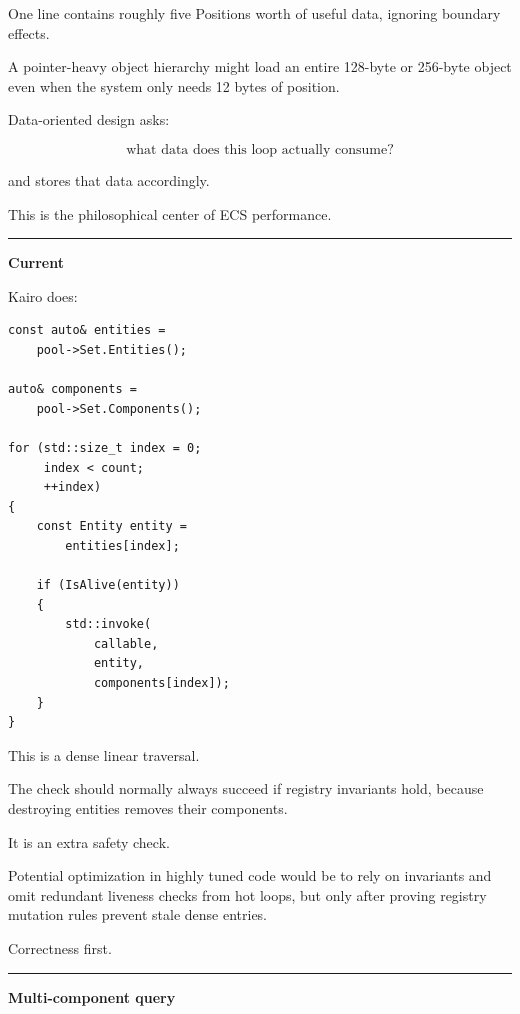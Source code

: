 One line contains roughly five Positions worth of useful data, ignoring boundary effects.

A pointer-heavy object hierarchy might load an entire 128-byte or 256-byte object even when the system only needs 12 bytes of position.

Data-oriented design asks:

\[
\boxed{
\text{what data does this loop actually consume?}
}
\]

and stores that data accordingly.

This is the philosophical center of ECS performance.

\begin{center}\rule{0.5\linewidth}{0.5pt}\end{center}

\textbf{Current }

Kairo does:

\begin{verbatim}
const auto& entities =
    pool->Set.Entities();

auto& components =
    pool->Set.Components();

for (std::size_t index = 0;
     index < count;
     ++index)
{
    const Entity entity =
        entities[index];

    if (IsAlive(entity))
    {
        std::invoke(
            callable,
            entity,
            components[index]);
    }
}
\end{verbatim}

This is a dense linear traversal.

The  check should normally always succeed if registry invariants hold, because destroying entities removes their components.

It is an extra safety check.

Potential optimization in highly tuned code would be to rely on invariants and omit redundant liveness checks from hot loops, but only after proving registry mutation rules prevent stale dense entries.

Correctness first.

\begin{center}\rule{0.5\linewidth}{0.5pt}\end{center}

\textbf{Multi-component query}


